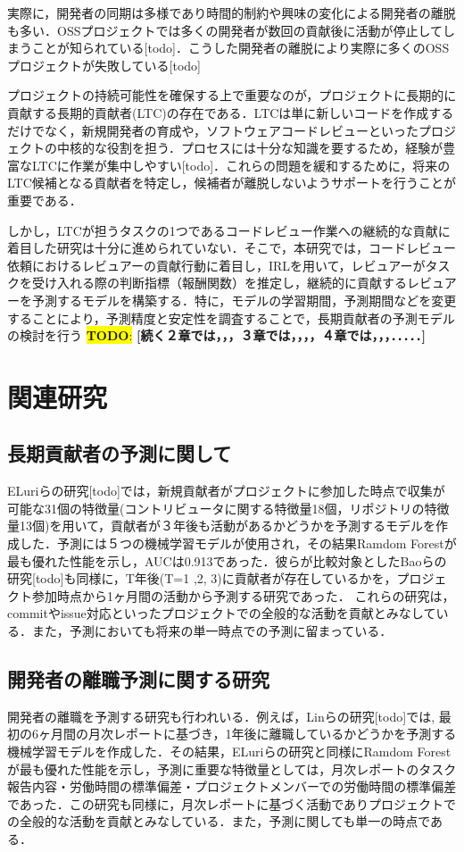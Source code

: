 \documentclass[submit,techrep,noauthor]{ipsj}
\newcommand{\todo}[1]{\colorbox{yellow}{{\bf TODO}:}{\color{red} {\textbf{[#1]}}}}
\begin{document}
実際に，開発者の同期は多様であり時間的制約や興味の変化による開発者の離脱も多い．OSSプロジェクトでは多くの開発者が数回の貢献後に活動が停止してしまうことが知られている[todo]．こうした開発者の離脱により実際に多くのOSSプロジェクトが失敗している[todo]

プロジェクトの持続可能性を確保する上で重要なのが，プロジェクトに長期的に貢献する長期的貢献者(LTC)の存在である．LTCは単に新しいコードを作成するだけでなく，新規開発者の育成や，ソフトウェアコードレビューといったプロジェクトの中核的な役割を担う．プロセスには十分な知識を要するため，経験が豊富なLTCに作業が集中しやすい[todo]．これらの問題を緩和するために，将来のLTC候補となる貢献者を特定し，候補者が離脱しないようサポートを行うことが重要である．

しかし，LTCが担うタスクの1つであるコードレビュー作業への継続的な貢献に着目した研究は十分に進められていない．そこで，本研究では，コードレビュー依頼におけるレビュアーの貢献行動に着目し，IRLを用いて，レビュアーがタスクを受け入れる際の判断指標（報酬関数）を推定し，継続的に貢献するレビュアーを予測するモデルを構築する．特に，モデルの学習期間，予測期間などを変更することにより，予測精度と安定性を調査することで，長期貢献者の予測モデルの検討を行う
\todo{続く２章では，，，３章では，，，，４章では，，，．．．．．}
\section{関連研究}
\subsection{長期貢献者の予測に関して}
ELuriらの研究[todo]では，新規貢献者がプロジェクトに参加した時点で収集が可能な31個の特徴量(コントリビュータに関する特徴量18個，リポジトリの特徴量13個)を用いて，貢献者が３年後も活動があるかどうかを予測するモデルを作成した．予測には５つの機械学習モデルが使用され，その結果Ramdom Forestが最も優れた性能を示し，AUCは0.913であった．彼らが比較対象としたBaoらの研究[todo]も同様に，T年後(T=1 ,2, 3)に貢献者が存在しているかを，プロジェクト参加時点から1ヶ月間の活動から予測する研究であった．
これらの研究は，commitやissue対応といったプロジェクトでの全般的な活動を貢献とみなしている．また，予測においても将来の単一時点での予測に留まっている．
\subsection{開発者の離職予測に関する研究}
開発者の離職を予測する研究も行われいる．例えば，Linらの研究[todo]では,
最初の6ヶ月間の月次レポートに基づき，1年後に離職しているかどうかを予測する機械学習モデルを作成した．その結果，ELuriらの研究と同様にRamdom Forestが最も優れた性能を示し，予測に重要な特徴量としては，月次レポートのタスク報告内容・労働時間の標準偏差・プロジェクトメンバーでの労働時間の標準偏差であった．この研究も同様に，月次レポートに基づく活動でありプロジェクトでの全般的な活動を貢献とみなしている．また，予測に関しても単一の時点である．
\end{document}
